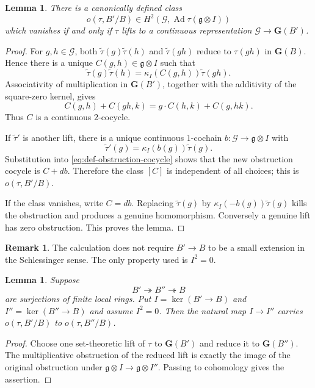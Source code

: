 \documentclass[11pt]{amsart}
\numberwithin{equation}{section}
\newcommand{\Ad}{\operatorname{Ad}}
\newcommand{\frakg}{\mathfrak g}
\newcommand{\GG}{\mathbf G}
\newtheorem{lemma}[theorem]{Lemma}
\theoremstyle{definition}
\newtheorem{remark}[theorem]{Remark}
\begin{document}
\begin{lemma}\label{lem:obstruction}
There is a canonically defined class
\[
 o(\tau,B'/B)\in
 H^2\!\left(\mathcal G,\Ad\tau(\frakg\otimes I)\right)
\]
which vanishes if and only if $\tau$ lifts to a continuous
representation $\mathcal G\to\GG(B')$.
\end{lemma}

\begin{proof}
For $g,h\in\mathcal G$, both
$\widetilde\tau(g)\widetilde\tau(h)$ and
$\widetilde\tau(gh)$ reduce to $\tau(gh)$ in $\GG(B)$.  Hence there is
a unique $C(g,h)\in\frakg\otimes I$ such that
\begin{equation}\label{eq:def-obstruction-cocycle}
 \widetilde\tau(g)\widetilde\tau(h)
 =\kappa_I(C(g,h))\widetilde\tau(gh).
\end{equation}
Associativity of multiplication in $\GG(B')$, together with the
additivity of the square-zero kernel, gives
\[
 C(g,h)+C(gh,k)
 =g\cdot C(h,k)+C(g,hk).
\]
Thus $C$ is a continuous $2$-cocycle.

If $\widetilde\tau'$ is another lift, there is a unique continuous
$1$-cochain $b:\mathcal G\to\frakg\otimes I$ with
\[
 \widetilde\tau'(g)=\kappa_I(b(g))\widetilde\tau(g).
\]
Substitution into \eqref{eq:def-obstruction-cocycle} shows that the
new obstruction cocycle is $C+db$.  Therefore the class $[C]$ is
independent of all choices; this is $o(\tau,B'/B)$.

If the class vanishes, write $C=db$. Replacing
$\widetilde\tau(g)$ by $\kappa_I(-b(g))\widetilde\tau(g)$ kills the
obstruction and produces a genuine homomorphism. Conversely a genuine lift
has zero obstruction.  This proves the lemma.
\end{proof}

\begin{remark}\label{rem:not-schlessinger-small}
The calculation does not require $B'\to B$ to be a small extension
in the Schlessinger sense. The only property used is $I^2=0$.
\end{remark}

\begin{lemma}\label{lem:obstruction-naturality}
Suppose
\[
        B'\twoheadrightarrow B''\twoheadrightarrow B
\]
are surjections of finite local rings. Put
$I=\ker(B'\to B)$ and $I''=\ker(B''\to B)$ and assume $I^2=0$.
Then the natural map $I\to I''$ carries
$o(\tau,B'/B)$ to $o(\tau,B''/B)$.
\end{lemma}

\begin{proof}
Choose one set-theoretic lift of $\tau$ to $\GG(B')$ and reduce it to
$\GG(B'')$.  The multiplicative obstruction of the reduced lift is exactly
the image of the original obstruction under
$\frakg\otimes I\to\frakg\otimes I''$.  Passing to cohomology gives
the assertion.
\end{proof}
\end{document}
